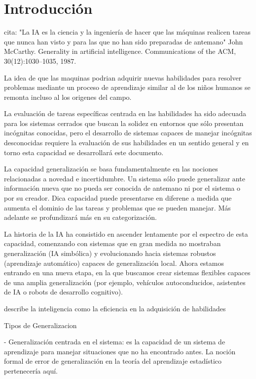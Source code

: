 \chapter*{Introducción}\label{chapter:introduction}


cita: "La IA es la ciencia y la ingeniería de hacer que las máquinas realicen tareas que nunca han visto y para las que no han sido preparadas de antemano" John McCarthy. Generality in artificial intelligence. Communications of the ACM, 30(12):1030–1035, 1987.

La idea de que las maquinas podrian adquirir nuevas habilidades para resolver problemas mediante un proceso de aprendizaje similar al de los niños humanos se remonta incluso al los origenes del campo.  

La evaluación de tareas específicas centrada en las habilidades ha sido adecuada para los sistemas cerrados que buscan la solidez en entornos que sólo presentan incógnitas conocidas, pero el desarrollo de sistemas capaces de manejar incógnitas desconocidas requiere la evaluación de sus habilidades en un sentido general y en torno esta capacidad se desarrollará este documento.

La capacidad generalización se basa fundamentalmente en las nociones relacionadas a novedad e incertidumbre. Un sistema sólo puede generalizar ante información nueva que no pueda ser conocida de antemano ni por el sistema o por su creador. Dica capacidad puede presentarse en diferene a medida que aumenta el dominio de las tareas y problemas que se pueden manejar. Más adelante se profundizará más en su categorización.

La historia de la IA ha consistido en ascender lentamente por el espectro de esta capacidad, comenzando con sistemas que en gran medida no mostraban generalización (IA simbólica) y evolucionando hacia sistemas robustos (aprendizaje automático) capaces de generalización local. Ahora estamos entrando en una nueva etapa, en la que buscamos crear sistemas flexibles capaces de una amplia generalización (por ejemplo, vehículos autoconducidos, asistentes de IA o robots de desarrollo cognitivo).


describe la inteligencia como la eficiencia en la adquisición de habilidades 


Tipos de Generalizacion

- Generalización centrada en el sistema: es la capacidad de un sistema de aprendizaje para manejar situaciones que no ha encontrado antes. La noción formal de error de generalización en la teoría del aprendizaje estadístico pertenecería aquí.

